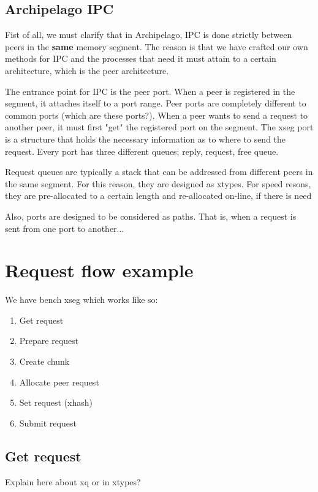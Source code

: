 \subsection{Archipelago IPC}\label{sec:arch-ipc}

Fist of all, we must clarify that in Archipelago, IPC is done strictly between 
peers in the \textbf{same} memory segment. The reason is that we have crafted 
our own methods for IPC and the processes that need it must attain to a certain 
architecture, which is the peer architecture.

The entrance point for IPC is the peer port. When a peer is registered in the 
segment, it attaches itself to a port range. Peer ports are completely different 
to common ports (which are these ports?). When a peer wants to send a request to 
another peer, it must first "get" the registered port on the segment. The xseg 
port is a structure that holds the necessary information as to where to send the 
request. Every port has three different queues; reply, request, free queue.

Request queues are typically a stack that can be addressed from different peers 
in the same segment. For this reason, they are designed as xtypes. For speed 
resons, they are pre-allocated to a certain length and re-allocated on-line, if 
there is need

Also, ports are designed to be considered as paths. That is, when a request is 
sent from one port to another...

\section{Request flow example}

We have bench xseg which works like so:

\begin{enumerate}
	\item Get request
	\item Prepare request
	\item Create chunk
	\item Allocate peer request
	\item Set request (xhash)
	\item Submit request
\end{enumerate}

\subsection{Get request}\label{sec:get-req-archip}

Explain here about xq or in xtypes?
